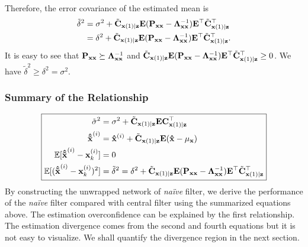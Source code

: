Therefore, the error covariance of the estimated mean is
\begin{equation}
\begin{split}
\tilde\delta^2&=\sigma^2+\tilde{\bf C}_{{\bf x}(1)|{\bf z}}{\bf E}({\bf P}_{\bf xx}-{\bf \Lambda}_{\bf xx}^{-1}){\bf E}^\top\tilde{\bf C}_{{\bf x}(1)|{\bf z}}^\top \\
&=\delta^2+\tilde{\bf C}_{{\bf x}(1)|{\bf z}}{\bf E}({\bf P}_{\bf xx}-{\bf \Lambda}_{\bf xx}^{-1}){\bf E}^\top\tilde{\bf C}_{{\bf x}(1)|{\bf z}}^\top.
\end{split}
\end{equation}
It is easy to see that ${\bf P}_{\bf xx}\succeq{\bf \Lambda}_{\bf xx}^{-1}$ and $\tilde{\bf C}_{{\bf x}(1)|{\bf z}}{\bf E}({\bf P}_{\bf xx}-{\bf \Lambda}_{\bf xx}^{-1}){\bf E}^\top\tilde{\bf C}_{{\bf x}(1)|{\bf z}}^\top\geq 0$. We have $\tilde\delta^2\geq\delta^2=\sigma^2$.
\subsubsection{Summary of the Relationship}
\begin{equation}
\boxed{
\begin{aligned}
\tilde\sigma^2&=\sigma^2+\tilde{\bf C}_{{\bf x}(1)|{\bf z}}{\bf E}{\bf C}_{{\bf x}(1)|{\bf z}}^\top \\
{\bf{\hat{\tilde x}}}^{(i)}&={\bf{\hat{ x}}}^{(i)}+\tilde{\bf C}_{{\bf x}(1)|{\bf z}}{\bf E}({\bf \hat x}-\mu_{\bf x})\\
\mathbb{E}[{\bf{\hat{\tilde x}}}^{(i)}-{\bf x}^{(i)}_{k}]&=0 \\
\mathbb{E}[({\bf{\hat{\tilde x}}}^{(i)}-{\bf x}^{(i)}_{k})^2]&=\tilde\delta^2=\delta^2+\tilde{\bf C}_{{\bf x}(1)|{\bf z}}{\bf E}({\bf P}_{\bf xx}-{\bf \Lambda}_{\bf xx}^{-1}){\bf E}^\top\tilde{\bf C}_{{\bf x}(1)|{\bf z}}^\top
\end{aligned}
} \\
\end{equation}
By constructing the unwrapped network of \textit{na\"ive} filter, we derive the performance of the \textit{na\"ive} filter compared with central filter using the summarized equations above. The estimation overconfidence can be explained by the first relationship. The estimation divergence comes from the second and fourth equations but it is not easy to visualize. We shall quantify the divergence region in the next section.

